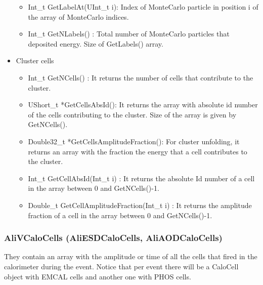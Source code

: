 \begin{itemize}
\begin{itemize}
         \item Int\_t GetLabelAt(UInt\_t i): Index of MonteCarlo particle in position i of the array of MonteCarlo indices.

	\item Int\_t GetNLabels() : Total number of MonteCarlo particles that deposited energy. Size of GetLabels() array.
	\end{itemize}

\item Cluster cells
	\begin{itemize}

	\item Int\_t GetNCells() : It returns the number of cells that contribute to the cluster.

	\item UShort\_t *GetCellsAbsId(): It returns the array with absolute id number of the cells contributing to the cluster. Size of the array is given by GetNCells().

	\item Double32\_t *GetCellsAmplitudeFraction(): For cluster unfolding, it returns an array with the fraction the energy that a cell contributes to the cluster. 

	\item Int\_t GetCellAbsId(Int\_t i) : It returns the absolute Id number of a cell in the array between 0 and GetNCells()-1. 

	\item Double\_t GetCellAmplitudeFraction(Int\_t i) : It returns the amplitude fraction of a cell in the array between 0 and GetNCells()-1.

	\end{itemize}

 \end{itemize}


\subsubsection{AliVCaloCells (AliESDCaloCells, AliAODCaloCells)}
They   contain an array with  the amplitude or time of all the cells that fired in the calorimeter during the event. Notice that per event there will be a CaloCell object with EMCAL cells and another one with PHOS cells.

